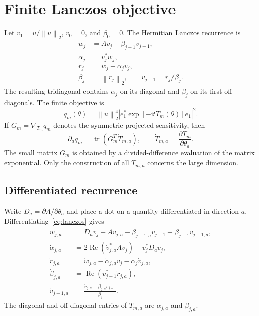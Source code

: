 \documentclass[10pt,letterpaper,twoside]{article}
\newcommand{\norm}[1]{\left\lVert #1\right\rVert}
\newcommand{\tr}{\operatorname{tr}}
\begin{document}
\section{Finite Lanczos objective}

Let $v_1=u/\norm{u}_2$, $v_0=0$, and $\beta_0=0$.  The Hermitian Lanczos
recurrence is
\begin{align}
 w_j &= A v_j-\beta_{j-1}v_{j-1}, \\
 \alpha_j &= v_j^*w_j, \\
 r_j &= w_j-\alpha_jv_j, \\
 \beta_j &= \norm{r_j}_2,
 \qquad v_{j+1}=r_j/\beta_j.
 \label{eq:lanczos}
\end{align}
The resulting tridiagonal contains $\alpha_j$ on its diagonal and $\beta_j$
on its first off-diagonals.  The finite objective is
\begin{equation}
 q_m(\theta)=\norm{u}_2^4
 \left|e_1^*\exp[-\mathrm{i}tT_m(\theta)]e_1\right|^2.
 \label{eq:finite-objective}
\end{equation}
If $G_m=\nabla_{T_m}q_m$ denotes the symmetric projected sensitivity, then
\begin{equation}
 \partial_a q_m=\tr\!\left(G_m^T\dot T_{m,a}\right),
 \qquad
 \dot T_{m,a}=\frac{\partial T_m}{\partial\theta_a}.
 \label{eq:contraction}
\end{equation}
The small matrix $G_m$ is obtained by a divided-difference evaluation of the
matrix exponential.  Only the construction of all $\dot T_{m,a}$ concerns the
large dimension.

\subsection{Differentiated recurrence}

Write $D_a=\partial A/\partial\theta_a$ and place a dot on a quantity
differentiated in direction $a$.  Differentiating~\eqref{eq:lanczos} gives
\begin{align}
 \dot w_{j,a}
 &=D_av_j+A\dot v_{j,a}
   -\dot\beta_{j-1,a}v_{j-1}-\beta_{j-1}\dot v_{j-1,a}, \\
 \dot\alpha_{j,a}
 &=2\operatorname{Re}(\dot v_{j,a}^*Av_j)
   +v_j^*D_av_j, \\
 \dot r_{j,a}
 &=\dot w_{j,a}-\dot\alpha_{j,a}v_j-\alpha_j\dot v_{j,a}, \\
 \dot\beta_{j,a}
 &=\operatorname{Re}(v_{j+1}^*\dot r_{j,a}), \\
 \dot v_{j+1,a}
 &=\frac{\dot r_{j,a}-\dot\beta_{j,a}v_{j+1}}{\beta_j}.
 \label{eq:tangent}
\end{align}
The diagonal and off-diagonal entries of $\dot T_{m,a}$ are
$\dot\alpha_{j,a}$ and $\dot\beta_{j,a}$.
\end{document}
